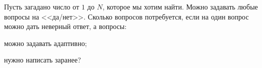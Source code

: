 Пусть загадано число от $1$ до $N$, которое мы хотим найти. Можно задавать любые вопросы на
<<да/нет>>. Сколько вопросов потребуется, если на один вопрос можно дать неверный ответ, а вопросы:
\begin{enumcyr}
    \item можно задавать адаптивно;
    \item нужно написать заранее?
\end{enumcyr}
